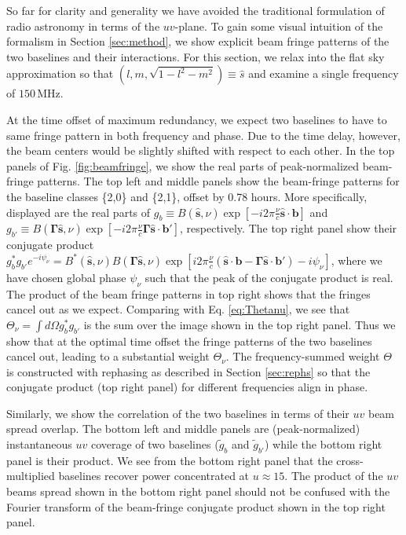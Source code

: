 \documentclass[twocolumn,apj,numberedappendix]{emulateapj}
\renewcommand\[{\begin{equation}}
\renewcommand\]{\end{equation}}
\begin{document}
So far for clarity and generality we have avoided the traditional formulation of radio astronomy in terms of the $uv$-plane. To gain some visual intuition of the formalism in Section \ref{sec:method}, we show explicit beam fringe patterns of the two baselines and their interactions. For this section, we relax into the flat sky approximation so that $(l,m,\sqrt{1-l^2-m^2})\equiv\hat{s}$ and examine a single frequency of $150$\,MHz. 

At the time offset of maximum redundancy, we expect two baselines to have to same fringe pattern in both frequency and phase. Due to the time delay, however, the beam centers would be slightly shifted with respect to each other. In the top panels of Fig. \ref{fig:beamfringe}, we show the real parts of peak-normalized beam-fringe patterns. The top left and middle panels show the beam-fringe
patterns for the baseline classes \{2,0\} and \{2,1\}, offset by 0.78 hours. More specifically, displayed are the real parts of $g_b\equiv B(\hat{\boldsymbol{s}},\nu)\exp\left[-i2\pi\frac{\nu}{c}\hat{\boldsymbol{s}}\cdot\boldsymbol{b}\right]$ and $g_{b'}\equiv B(\boldsymbol{\Gamma}\hat{\boldsymbol{s}},\nu)\exp\left[-i2\pi\frac{\nu}{c}\boldsymbol{\Gamma}\hat{\boldsymbol{s}}\cdot\boldsymbol{b'}\right]$, respectively. The top right panel show their conjugate product $g_{b}^{*}g_{b'}e^{-i\psi_\nu} = B^{*}(\hat{\boldsymbol{s}},\nu)B(\boldsymbol{\Gamma}\hat{\boldsymbol{s}},\nu)\exp\left[i2\pi\frac{\nu}{c}\left(\hat{\boldsymbol{s}}\cdot\boldsymbol{b}-\boldsymbol{\Gamma}\hat{\boldsymbol{s}}\cdot\boldsymbol{b'}\right)-i\psi_{\nu}\right]$, where we have chosen global phase $\psi_{\nu}$ such that the peak of the conjugate product is real. The product of the beam fringe patterns in top right shows that the fringes
 cancel out as we expect. Comparing with Eq. \eqref{eq:Thetanu}, we see that $\Theta_\nu=\int d\Omega g_{b}^{*}g_{b'}$ is the sum over the image shown in the top right panel. Thus we show that at the optimal time offset the fringe patterns of the two baselines cancel out, leading to a substantial weight $\Theta_\nu$. The frequency-summed weight $\Theta$ is constructed with rephasing as described in Section \ref{sec:rephs} so that the conjugate product (top right panel) for different frequencies align in phase. 
 
Similarly, we show the correlation of the two baselines in terms of their $uv$ beam spread overlap. The bottom left and middle panels are (peak-normalized) instantaneous $uv$ coverage of two baselines ($\widetilde{g}_{b}$ and $\widetilde{g}_{b'}$) while the bottom right panel is their product. We see from the bottom right panel that the cross-multiplied baselines recover power concentrated at $u\approx15$. The product of the $uv$ beams spread shown in the bottom right panel should not be confused with the Fourier transform of the beam-fringe conjugate product shown in the top right panel. 
\end{document}
